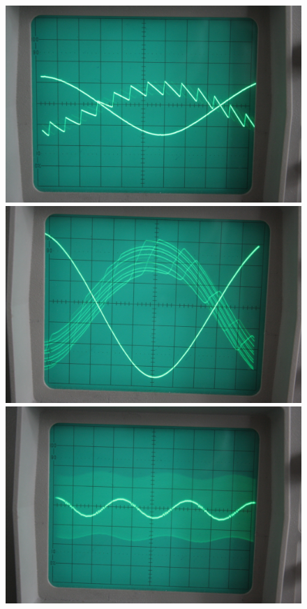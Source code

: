 \begin{figure}[htbp]
	\centering
	\begin{minipage}{.3\linewidth}
		\includegraphics[width=\linewidth]{Oszi_Foto/4-800.jpg}
	\end{minipage}
	\hfill
	\begin{minipage}{.3\linewidth}
		\includegraphics[width=\linewidth]{Oszi_Foto/4-801.jpg}
	\end{minipage}
	\hfill
	\begin{minipage}{.3\linewidth}
		\includegraphics[width=\linewidth]{Oszi_Foto/4-802.jpg}

\end{minipage}
\end{figure}
